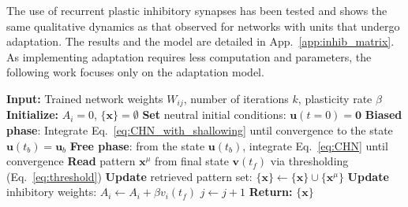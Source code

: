 \documentclass[10pt,letterpaper]{article}
\begin{document}
The use of recurrent plastic inhibitory synapses has been tested and shows the same qualitative dynamics as that observed for networks with units that undergo adaptation. The results and the model are detailed in App.~\ref{app:inhib_matrix}.
As implementing adaptation requires less computation and parameters, the following work focuses only on the adaptation model.

\begin{algorithm}[h]
\caption{Autonomous retrieval (AR)}
\begin{algorithmic}[1]
\State \textbf{Input:} Trained network weights $W_{ij}$, number of iterations $k$, plasticity rate $\beta$
\State \textbf{Initialize:} $A_i=0$, $\{\mathbf{x}\}=\emptyset$
   \State \textbf{Set} neutral initial conditions: $\mathbf{u}(t=0)=\mathbf{0}$
   \State \textbf{Biased phase}: Integrate Eq.~\ref{eq:CHN_with_shallowing} until convergence to the state $\mathbf{u}(t_{b})=\mathbf{u}_b$
   \State \textbf{Free phase}: from the state $\mathbf{u}(t_{b})$, integrate Eq.~\ref{eq:CHN} until convergence 
   \State \textbf{Read} pattern $\mathbf{x}^{\mu}$ from final state $\mathbf{v}(t_{f})$ via thresholding (Eq.~\ref{eq:threshold})
   \State \textbf{Update} retrieved pattern set: $\{\mathbf{x}\} \leftarrow \{\mathbf{x}\} \cup \{\mathbf{x}^{\mu}\}$
   \State \textbf{Update} inhibitory weights: $A_i \leftarrow A_i+\beta v_i(t_{f})$
   \State $j \leftarrow j+1$
\EndWhile
\State \textbf{Return:} $\{\mathbf{x}\}$
\end{algorithmic}
\label{alg:autonomous_rehearsal}
\end{algorithm}
\end{document}
